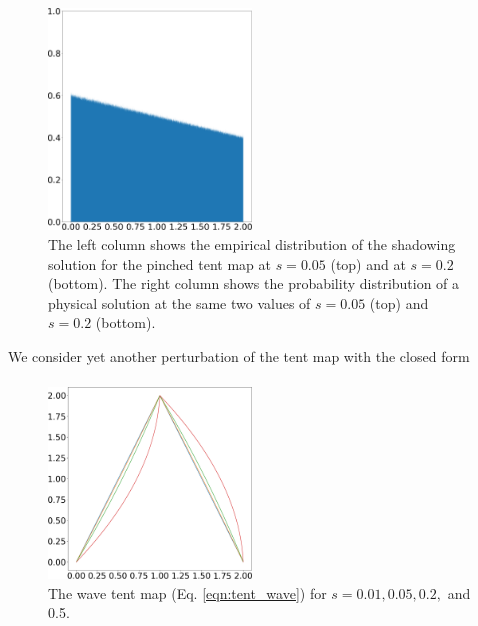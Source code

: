 \begin{figure}[H]
    \includegraphics[width=0.48\textwidth]{figure/tent_pinched_physical_density_0.2.png}
    \caption{The left column shows the empirical distribution of the shadowing solution for the pinched tent map at $s=0.05$ (top) and at $s=0.2$ (bottom). The right column shows the probability distribution of a physical solution at the same two values of $s = 0.05$ (top) and $s = 0.2$ (bottom).}
    \label{fig:tent_pinched_shadow}
\end{figure}
We consider yet another perturbation of the tent map with the closed form
\begin{align}
    \label{eqn:tent_wave}
\end{align}
\begin{figure}[H]
    \centering
    \includegraphics[width=0.48\textwidth]{figure/wave_tent_map.png}
    \caption{The wave tent map (Eq. \ref{eqn:tent_wave}) for $s = 0.01, 0.05, 0.2,$ and 0.5.}
    \label{fig:tent_wave}
\end{figure}

